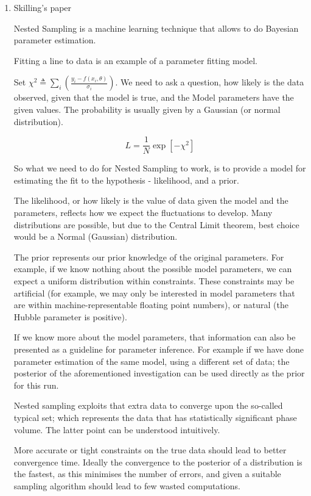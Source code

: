 \documentclass[11pt]{article}
\begin{document}
\begin{enumerate}
\item Skilling's paper
\label{sec:orged9b68d}

\cite{skilling2006}

Nested Sampling is a machine learning technique that allows to do Bayesian parameter estimation. 

Fitting a line to data is an example of a parameter fitting model. 

Set \(\chi^{2} \triangleq \sum_{i} \left(\frac{y_{i} - f(x_{i}, \theta)}{\sigma_{i}} \right)\). We need to ask a question, how likely is the data observed, given that the model is true, and the Model parameters have the given values. The probability is usually given by a Gaussian (or normal distribution). 

\[ 
	 L = \frac{1}{N} \exp{\left[ - \chi^{2}\right]}
	 \]

So what we need to do for Nested Sampling to work, is to
provide a model for estimating the fit to the hypothesis -
likelihood, and a prior.

The likelihood, or how likely is the value of data given the
model and the parameters, reflects how we expect the
fluctuations to develop. Many distributions are possible, but
due to the Central Limit theorem, best choice would be a
Normal (Gaussian) distribution.

The prior represents our prior knowledge of the original
parameters. For example, if we know nothing about the
possible model parameters, we can expect a uniform
distribution within constraints. These constraints may be
artificial (for example, we may only be interested in model
parameters that are within machine-representable floating
point numbers), or natural (the Hubble parameter is
positive).

If we know more about the model parameters, that information
can also be presented as a guideline for parameter
inference. For example if we have done parameter estimation
of the same model, using a different set of data; the
posterior of the aforementioned investigation can be used
directly as the prior for this run.

Nested sampling exploits that extra data to converge upon the
so-called typical set; which represents the data that has
statistically significant phase volume. The latter point can
be understood intuitively.

More accurate or tight constraints on the true data should
lead to better convergence time. Ideally the convergence to
the posterior of a distribution is the fastest, as this
minimises the number of errors, and given a suitable sampling
algorithm should lead to few wasted computations.



\end{enumerate}
\end{document}
